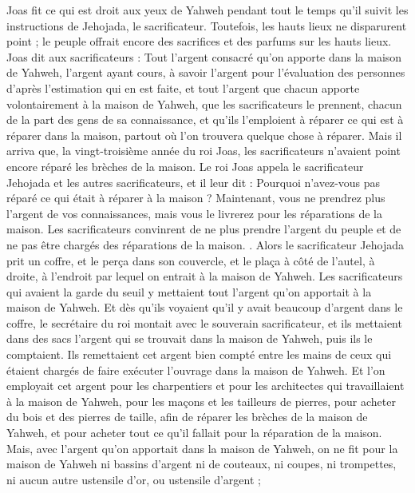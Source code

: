 \begin{multicols}{2}
Joas fit ce qui est droit aux yeux de Yahweh pendant tout le temps qu'il suivit les instructions de Jehojada, le sacrificateur.
Toutefois, les hauts lieux ne disparurent point ; le peuple offrait encore des sacrifices et des parfums sur les hauts lieux.
Joas dit aux sacrificateurs : Tout l'argent consacré qu'on apporte dans la maison de Yahweh, l'argent ayant cours, à savoir l'argent pour l'évaluation des personnes d'après l'estimation qui en est faite, et tout l'argent que chacun apporte volontairement à la maison de Yahweh,
que les sacrificateurs le prennent, chacun de la part des gens de sa connaissance, et qu'ils l'emploient à réparer ce qui est à réparer dans la maison, partout où l'on trouvera quelque chose à réparer.
Mais il arriva que, la vingt-troisième année du roi Joas, les sacrificateurs n'avaient point encore réparé les brèches de la maison.
Le roi Joas appela le sacrificateur Jehojada et les autres sacrificateurs, et il leur dit : Pourquoi n'avez-vous pas réparé ce qui était à réparer à la maison ? Maintenant, vous ne prendrez plus l'argent de vos connaissances, mais vous le livrerez pour les réparations de la maison.
Les sacrificateurs convinrent de ne plus prendre l'argent du peuple et de ne pas être chargés des réparations de la maison.
.
Alors le sacrificateur Jehojada prit un coffre, et le perça dans son couvercle, et le plaça à côté de l'autel, à droite, à l'endroit par lequel on entrait à la maison de Yahweh. Les sacrificateurs qui avaient la garde du seuil y mettaient tout l'argent qu'on apportait à la maison de Yahweh.
Et dès qu'ils voyaient qu'il y avait beaucoup d'argent dans le coffre, le secrétaire du roi montait avec le souverain sacrificateur, et ils mettaient dans des sacs l'argent qui se trouvait dans la maison de Yahweh, puis ils le comptaient.
Ils remettaient cet argent bien compté entre les mains de ceux qui étaient chargés de faire exécuter l'ouvrage dans la maison de Yahweh. Et l'on employait cet argent pour les charpentiers et pour les architectes qui travaillaient à la maison de Yahweh,
pour les maçons et les tailleurs de pierres, pour acheter du bois et des pierres de taille, afin de réparer les brèches de la maison de Yahweh, et pour acheter tout ce qu'il fallait pour la réparation de la maison.
Mais, avec l'argent qu'on apportait dans la maison de Yahweh, on ne fit pour la maison de Yahweh ni bassins d'argent ni de couteaux, ni coupes, ni trompettes, ni aucun autre ustensile d'or, ou ustensile d'argent ;

\end{multicols}
